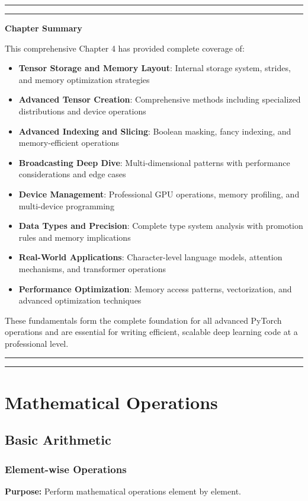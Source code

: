\documentclass[11pt,a4paper]{book}
\newenvironment{summarybox}
{\begin{center}
\begin{minipage}{0.95\textwidth}
\vspace{0.5em}
\hrule height 1pt
\vspace{0.3em}
\hrule height 0.5pt
\vspace{0.7em}
\textbf{Chapter Summary} \par\vspace{0.3em}}
{\vspace{0.5em}
\hrule height 0.5pt
\vspace{0.3em}
\hrule height 1pt
\vspace{0.5em}
\end{minipage}
\end{center}}
\begin{document}
\begin{summarybox}
This comprehensive Chapter 4 has provided complete coverage of:

\begin{itemize}
\item \textbf{Tensor Storage and Memory Layout}: Internal storage system, strides, and memory optimization strategies
\item \textbf{Advanced Tensor Creation}: Comprehensive methods including specialized distributions and device operations
\item \textbf{Advanced Indexing and Slicing}: Boolean masking, fancy indexing, and memory-efficient operations
\item \textbf{Broadcasting Deep Dive}: Multi-dimensional patterns with performance considerations and edge cases  
\item \textbf{Device Management}: Professional GPU operations, memory profiling, and multi-device programming
\item \textbf{Data Types and Precision}: Complete type system analysis with promotion rules and memory implications
\item \textbf{Real-World Applications}: Character-level language models, attention mechanisms, and transformer operations
\item \textbf{Performance Optimization}: Memory access patterns, vectorization, and advanced optimization techniques
\end{itemize}

These fundamentals form the complete foundation for all advanced PyTorch operations and are essential for writing efficient, scalable deep learning code at a professional level.
\end{summarybox}

\chapter{Mathematical Operations}

\section{Basic Arithmetic}

\subsection{Element-wise Operations}

\textbf{Purpose:} Perform mathematical operations element by element.
\end{document}
